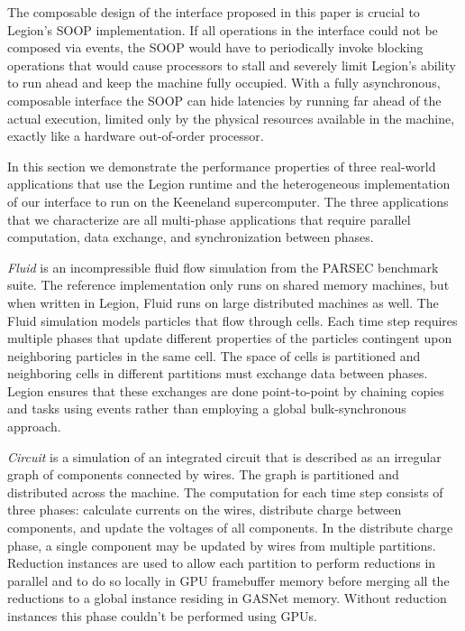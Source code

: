 The composable design of the interface proposed in
this paper is crucial to Legion's SOOP implementation.  If all
operations in the interface could not be composed via events, 
the SOOP would have to periodically invoke
blocking operations that would cause processors to stall and severely
limit Legion's ability to run ahead and keep the machine fully
occupied.  With a fully asynchronous, composable interface the SOOP can hide latencies by 
running far ahead of the actual execution, limited only by the physical resources
available in the machine, exactly like a hardware out-of-order processor.

In this section we demonstrate the performance properties of three
real-world applications that use the Legion runtime and the heterogeneous
implementation of our interface to run on the Keeneland supercomputer.
The three applications that we characterize are all multi-phase
applications that require parallel computation, data exchange, and
synchronization between phases. 

{\em Fluid} is an incompressible fluid flow simulation from the PARSEC
benchmark suite\cite{bienia11benchmarking}.  The reference implementation 
only runs on shared memory machines, but when written in Legion, Fluid
runs on large distributed machines as well.  The Fluid simulation
models particles that flow through cells.  Each time step requires multiple phases
that update different properties of the particles contingent upon neighboring
particles in the same cell.  The space of cells is partitioned and neighboring
cells in different partitions must exchange data between phases.  Legion ensures
that these exchanges are done point-to-point by chaining copies and tasks
using events rather than employing a global bulk-synchronous approach.

{\em Circuit} is a simulation of an integrated circuit that is described as an
irregular graph of components connected by wires.  The graph is partitioned
and distributed across the machine.  The computation for each time step consists
of three phases: calculate currents on the wires, distribute charge between
components, and update the voltages of all components.  In the distribute charge
phase, a single component may be updated by wires from multiple partitions.  Reduction instances 
are used to allow each partition to perform reductions in parallel and to do so locally in GPU
framebuffer memory before merging all the reductions to a global instance
residing in GASNet memory.  Without reduction instances this phase
couldn't be performed using GPUs.

